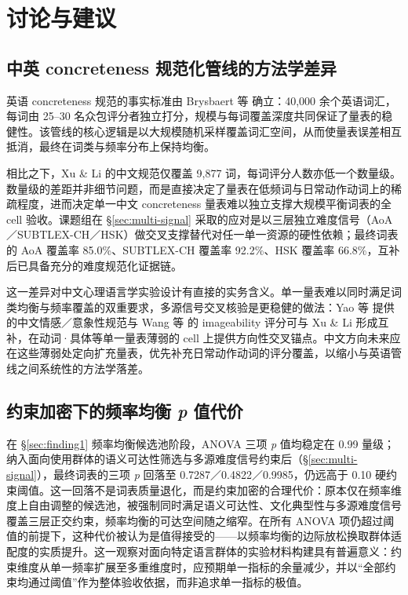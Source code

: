 \documentclass[12pt, a4paper]{article}
\begin{document}
\section{讨论与建议}
\label{sec:discussion}

\subsection{中英 concreteness 规范化管线的方法学差异}

英语 concreteness 规范的事实标准由 Brysbaert 等 \cite{brysbaert2014concreteness} 确立：40{,}000 余个英语词汇，每词由 25--30 名众包评分者独立打分，规模与每词覆盖深度共同保证了量表的稳健性。该管线的核心逻辑是以大规模随机采样覆盖词汇空间，从而使量表误差相互抵消，最终在词类与频率分布上保持均衡。

相比之下，Xu \& Li \cite{xu2020concreteness} 的中文规范仅覆盖 9{,}877 词，每词评分人数亦低一个数量级。数量级的差距并非细节问题，而是直接决定了量表在低频词与日常动作动词上的稀疏程度，进而决定单一中文 concreteness 量表难以独立支撑大规模平衡词表的全 cell 验收。课题组在 \S\ref{sec:multi-signal} 采取的应对是以三层独立难度信号（AoA／SUBTLEX-CH／HSK）做交叉支撑替代对任一单一资源的硬性依赖；最终词表的 AoA 覆盖率 85.0\%、SUBTLEX-CH 覆盖率 92.2\%、HSK 覆盖率 66.8\%，互补后已具备充分的难度规范化证据链。

这一差异对中文心理语言学实验设计有直接的实务含义。单一量表难以同时满足词类均衡与频率覆盖的双重要求，多源信号交叉核验是更稳健的做法：Yao 等 \cite{yao2017norms} 提供的中文情感／意象性规范与 Wang 等 \cite{wang2019imageability} 的 imageability 评分可与 Xu \& Li 形成互补，在动词·具体等单一量表薄弱的 cell 上提供方向性交叉锚点。中文方向未来应在这些薄弱处定向扩充量表，优先补充日常动作动词的评分覆盖，以缩小与英语管线之间系统性的方法学落差。

\subsection{约束加密下的频率均衡 \textit{p} 值代价}

在 \S\ref{sec:finding1} 频率均衡候选池阶段，ANOVA 三项 \textit{p} 值均稳定在 0.99 量级；纳入面向使用群体的语义可达性筛选与多源难度信号约束后（\S\ref{sec:multi-signal}），最终词表的三项 \textit{p} 回落至 0.7287／0.4822／0.9985，仍远高于 0.10 硬约束阈值。这一回落不是词表质量退化，而是约束加密的合理代价：原本仅在频率维度上自由调整的候选池，被强制同时满足语义可达性、文化典型性与多源难度信号覆盖三层正交约束，频率均衡的可达空间随之缩窄。在所有 ANOVA 项仍超过阈值的前提下，这种代价被认为是值得接受的——以频率均衡的边际放松换取群体适配度的实质提升。这一观察对面向特定语言群体的实验材料构建具有普遍意义：约束维度从单一频率扩展至多重维度时，应预期单一指标的余量减少，并以“全部约束均通过阈值”作为整体验收依据，而非追求单一指标的极值。
\end{document}

